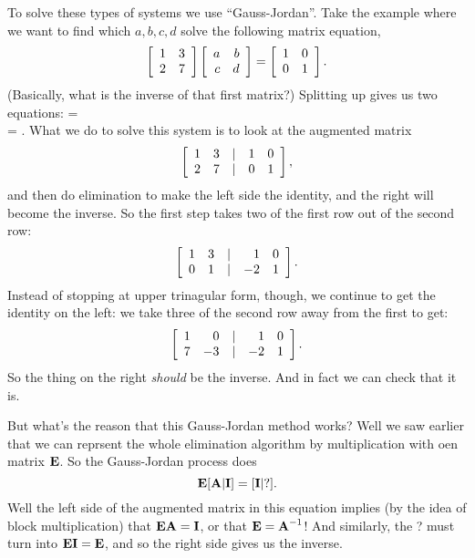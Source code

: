 To solve these types of systems we use ``Gauss-Jordan''. 
\bex
Take the example where we want to find which $a,b,c,d$ solve the following matrix equation,
\[ \left[ \begin{array}{rrrrrrrrrrrrrrrrrrrrrrrrr} 1&3\\2&7\\ \end{array} \right]\left[ \begin{array}{rrrrrrrrrrrrrrrrrrrrrrrrr} a&b\\c&d\\ \end{array} \right] = \left[ \begin{array}{rrrrrrrrrrrrrrrrrrrrrrrrr} 1&0\\0&1\\ \end{array} \right]. \]
(Basically, what is the inverse of that first matrix?) Splitting up gives us two equations:
\bea
{} =  \\
 = .
\eea
What we do to solve this system is to look at the augmented matrix
\[ \left[ \begin{array}{rrrrrrrrrrrrrrrrrrrrrrrrr} 1&3&|&1&0\\2&7&|&0&1\\ \end{array} \right], \]
and then do elimination to make the left side the identity, and the right will become the inverse. So the first step takes two of the first row out of the second row:
\[ \left[ \begin{array}{rrrrrrrrrrrrrrrrrrrrrrrrr} 1&3&|&1&0\\0&1&|&-2&1\\ \end{array} \right]. \]
Instead of stopping at upper trinagular form, though, we continue to get the identity on the left: we take three of the second row away from the first to get:
\[ \left[ \begin{array}{rrrrrrrrrrrrrrrrrrrrrrrrr} 1&0&|&1&0\\7&-3&|&-2&1\\ \end{array} \right]. \]
So the thing on the right \textit{should} be the inverse. And in fact we can check that it is. 
\eex

But what's the reason that this Gauss-Jordan method works?
Well we saw earlier that we can reprsent the whole elimination algorithm by multiplication with oen matrix $\boldsymbol{\mathbf{E}}$. So the Gauss-Jordan process does
\[ \boldsymbol{\mathbf{E}} [\boldsymbol{\mathbf{A}} | \boldsymbol{\mathbf{I}}] = [\boldsymbol{\mathbf{I}} | ?]. \]
Well the left side of the augmented matrix in this equation implies (by the idea of block multiplication) that $\boldsymbol{\mathbf{E}} \boldsymbol{\mathbf{A}} = \boldsymbol{\mathbf{I}}$, or that $\boldsymbol{\mathbf{E}} = \boldsymbol{\mathbf{A}}^{-1}$! And similarly, the ? must turn into $\boldsymbol{\mathbf{E}} \boldsymbol{\mathbf{I}} = \boldsymbol{\mathbf{E}}$, and so the right side gives us the inverse.


